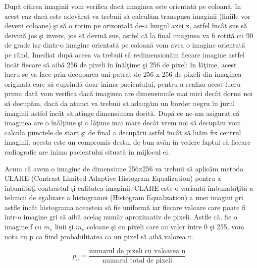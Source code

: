 Dup\u{a} citirea imaginii vom verifica dac\u{a} imaginea este orientat\u{a} pe coloan\u{a}, \^{i}n acest caz dac\u{a} este adev\u{a}rat  va trebuii s\u{a} calcul\u{a}m transpusa imaginii (liniile vor deveni coloane) \c{s}i s\u{a} o rotim pe orizontal\u{a} de-a lungul axei x, astfel \^{i}nc\^{a}t sus s\u{a} deivin\u{a} jos \c{s}i invers, jos s\u{a} devin\u{a} sus, astfel c\u{a} la final imaginea va fi rotit\u{a} cu 90 de grade iar dintr-o imagine orientat\u{a} pe coloan\u{a} vom avea o imagine orientat\u{a} pe r\^{a}nd. Imediat dup\u{a} aceea va trebuii s\u{a} redimension\u{a}m fiecare imagine astfel \^{i}nc\^{a}t fiecare s\u{a} aib\u{a} 256 de pixeli \^{i}n \^{i}n\u{a}l\c{t}ime \c{s}i 256 de pixeli \^{i}n l\u{a}\c{t}ime, acest lucru se va face prin decuparea uni patrat de 256 x 256 de pixeli din imaginea original\u{a} care s\u{a} cuprind\u{a} doar inima pacientului, pentru a realiza acest lucru prima dat\u{a} vom verifica dac\u{a} imaginea are dimensiunile mai mici dec\^{a}t dormi noi s\u{a} decup\u{a}m, dac\u{a} da atunci va trebuii s\u{a} adaug\u{a}m un border negru \^{i}n jurul imaginii astfel \^{i}nc\^{a}t s\u{a} atinge dimensiunea dorit\u{a}. Dup\u{a} ce ne-am asigurat c\u{a} imaginea are o \^{i}n\u{a}l\c{t}ime \c{s}i o l\u{a}\c{t}ime mai mare dec\^{a}t vrem noi s\u{a} decup\u{a}m  vom calcula punctele de start \c{s}i de final a decup\u{a}rii astfel \^{i}nc\^{a}t s\u{a} lu\u{a}m fix centrul imaginii, acesta este un compromis destul de bun av\^{a}n \^{i}n vedere faptul c\u{a} fiecare radiografie are inima pacientului situat\u{a} in mijlocul ei.

\par

Acum c\u{a} avem o imagine de dimensiune 256x256 va trebuii s\u{a} aplic\u{a}m metoda CLAHE (Contrast Limited Adaptive Histogram Equalization) pentru a \^{i}nbun\u{a}t\u{a}\c{t}i contrastul \c{s}i calitatea imaginii. CLAHE este o variant\u{a} \^{i}mbunat\u{a}\c{t}it\u{a} a tehnicii de egalizare a histogramei (Histogram Equalization) a unei imagini gri astfle \^{i}nc\^{a}t histograma aceasteia s\u{a} fie uniform\u{a} iar fiecare valoare care poate fi \^{i}ntr-o imagine gri s\u{a} aib\u{a} acela\c{s} num\u{a}r aproximativ de pixeli. Astfle c\u{a}, fie o imagine f cu $m_r$ linii \c{s}i $m_c$ coloane \c{s}i cu pixeli care au valor \^{i}ntre 0 \c{s}i 255, vom nota cu p ca fiind probabilitatea ca un pixel s\u{a} aib\u{a} valorea n.

$$p_n = \frac{\text{numarul de pixeli cu valoarea n}}{\text{numarul total de pixeli}}$$

